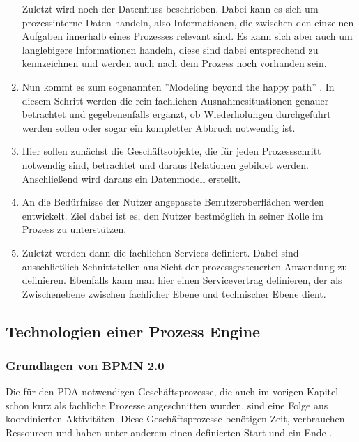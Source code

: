 \begin{enumerate}
    Zuletzt wird noch der Datenfluss beschrieben. Dabei kann es sich um prozessinterne Daten handeln, also Informationen, die zwischen den einzelnen Aufgaben innerhalb eines Prozesses relevant sind. Es kann sich aber auch um langlebigere Informationen handeln, diese sind dabei entsprechend zu kennzeichnen und werden auch nach dem Prozess noch vorhanden sein. \citep[vgl.][S. 67]{stiehl_prozessgesteuerte_2013}
    
    \item Nun kommt es zum sogenannten ''Modeling beyond the happy path'' \citep{camunda_services_gmbh_modeling_2024}. In diesem Schritt werden die rein fachlichen Ausnahmesituationen genauer betrachtet und gegebenenfalls ergänzt, ob Wiederholungen durchgeführt werden sollen oder sogar ein kompletter Abbruch notwendig ist. \citep[vgl.][S. 67]{stiehl_prozessgesteuerte_2013}
    
    \item Hier sollen zunächst die Geschäftsobjekte, die für jeden Prozessschritt notwendig sind, betrachtet und daraus Relationen gebildet werden. Anschließend wird daraus ein Datenmodell erstellt. \citep[vgl.][S. 69f]{stiehl_prozessgesteuerte_2013}
    
    \item An die Bedürfnisse der Nutzer angepasste Benutzeroberflächen werden entwickelt. Ziel dabei ist es, den Nutzer bestmöglich in seiner Rolle im Prozess zu unterstützen. \citep[vgl.][S. 70f]{stiehl_prozessgesteuerte_2013}
    
    \item Zuletzt werden dann die fachlichen Services definiert. Dabei sind ausschließlich Schnittstellen aus Sicht der prozessgesteuerten Anwendung zu definieren. Ebenfalls kann man hier einen Servicevertrag definieren, der als Zwischenebene zwischen fachlicher Ebene und technischer Ebene dient. \citep[vgl.][S. 72f]{stiehl_prozessgesteuerte_2013}
\end{enumerate}

\clearpage
\subsection{Technologien einer Prozess Engine}
\subsubsection{Grundlagen von BPMN 2.0}
Die für den \ac{PDA} notwendigen Geschäftsprozesse, die auch im vorigen Kapitel schon kurz als fachliche Prozesse angeschnitten wurden, sind eine Folge aus koordinierten Aktivitäten. Diese Geschäftsprozesse benötigen Zeit, verbrauchen Ressourcen und haben unter anderem einen definierten Start und ein Ende \citep[vgl.][S. 1]{gopfert_geschaftsprozessmodellierung_2013}. 

